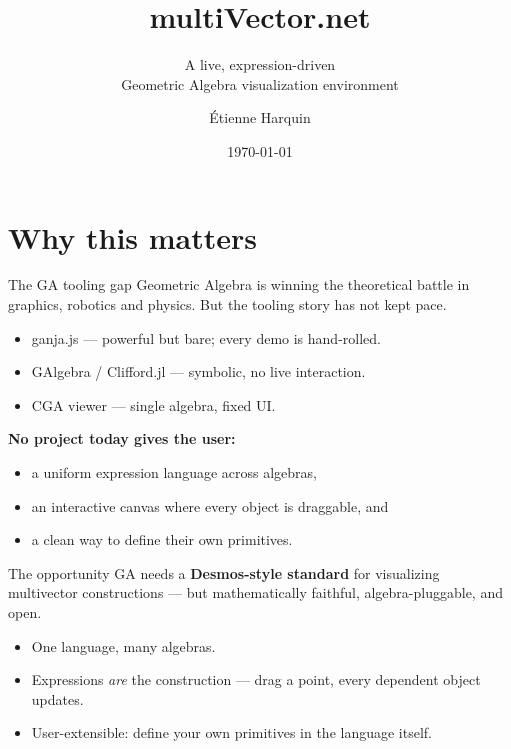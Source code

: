 \documentclass[aspectratio=169,11pt]{beamer}
\title{\textbf{multiVector.net}}
\subtitle{A live, expression-driven \\ Geometric Algebra visualization environment}
\author{Étienne Harquin}
\institute{PhD candidate}
\date{\today}
\begin{document}
\maketitle

\section{Why this matters}

\begin{frame}{The GA tooling gap}
  Geometric Algebra is winning the theoretical battle in graphics, robotics
  and physics. But the tooling story has not kept pace.
  \begin{itemize}
    \item \alert{ganja.js} — powerful but bare; every demo is hand-rolled.
    \item \alert{GAlgebra / Clifford.jl} — symbolic, no live interaction.
    \item \alert{CGA viewer} — single algebra, fixed UI.
  \end{itemize}
  \vfill
  \textbf{No project today gives the user:}
  \begin{itemize}
    \item a uniform expression language across algebras,
    \item an interactive canvas where every object is draggable, and
    \item a clean way to define their own primitives.
  \end{itemize}
\end{frame}

\begin{frame}{The opportunity}
  GA needs a \textbf{Desmos-style standard} for visualizing multivector
  constructions — but mathematically faithful, algebra-pluggable, and
  open.

  \begin{center}
  \end{center}

  \vspace{-2pt}
  \begin{itemize}
    \item One language, many algebras.
    \item Expressions \emph{are} the construction — drag a point, every
          dependent object updates.
    \item User-extensible: define your own primitives in the language itself.
  \end{itemize}
\end{frame}
\end{document}
